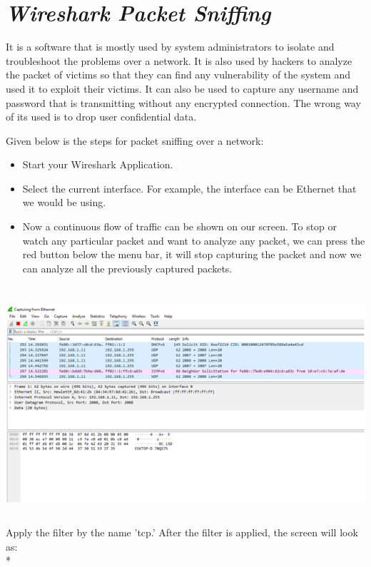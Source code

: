 \documentclass[12pt, a4paper]{report}
\begin{document}
\chapter{\emph{Wireshark Packet Sniffing}}

It is a software that is mostly used by system administrators to isolate
and troubleshoot the problems over a network. It is also used by hackers
to analyze the packet of victims so that they can find any vulnerability
of the system and used it to exploit their victims. It can also be used
to capture any username and password that is transmitting without any
encrypted connection. The wrong way of its used is to drop user
confidential data.

Given below is the steps for packet sniffing over a network:

\begin{itemize}
\item
  Start your Wireshark Application.
\item
  Select the current interface. For example, the interface can be
  Ethernet that we would be using.
\item
  Now a continuous flow of traffic can be shown on our screen. To stop
  or watch any particular packet and want to analyze any packet, we can
  press the red button below the menu bar, it will stop capturing the
  packet and now we can analyze all the previously captured packets.
\end{itemize}

\includegraphics[width=6.26772in,height=3.45833in]{image7.png}
\\
Apply the filter by the name 'tcp.' After the filter is applied, the
screen will look as:
\\*
\end{document}
